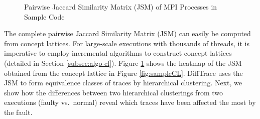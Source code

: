 
\begin{figure}[]
\centering
{}
\caption{Pairwise Jaccard Similarity Matrix (JSM) of MPI Processes in Sample Code}
\label{fig:jsm2}
\end{figure}

% 
%

The complete pairwise Jaccard Similarity Matrix (JSM) can easily be computed from concept lattices.
%
For large-scale executions with thousands of threads, it is imperative
to employ incremental algorithms to
construct concept lattices (detailed in Section \ref{subsec:algo-cl}).
%
%
Figure \ref{fig:jsm2}
shows the heatmap
of the JSM obtained from the concept lattice in Figure \ref{fig:sampleCL}.
%
DiffTrace uses the JSM to form equivalence classes of traces by hierarchical clustering.
%
Next, we show how the differences between two hierarchical clusterings from two executions
(faulty vs.~normal) reveal which traces have been affected the most by the fault.


